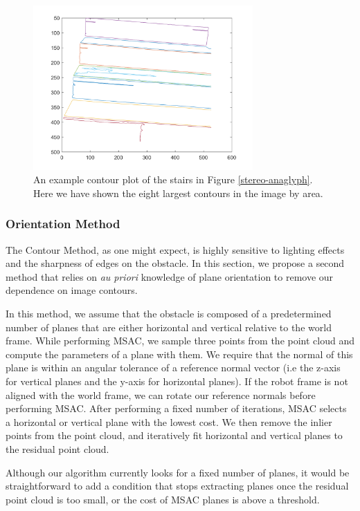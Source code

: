 \begin{figure}[!h]
\centering
\includegraphics[width=3.3in]{Sections/Figures/good_contour_plot_12-7.png}
\caption{An example contour plot of the stairs in Figure \ref{stereo-anaglyph}. Here we have shown the eight largest contours in the image by area.}
\label{contours-example}
\end{figure}

\subsubsection{Orientation Method} \label{orient-method}

The Contour Method, as one might expect, is highly sensitive to lighting effects and the sharpness of edges on the obstacle. In this section, we propose a second method that relies on \textit{au priori} knowledge of plane orientation to remove our dependence on image contours.

In this method, we assume that the obstacle is composed of a predetermined number of planes that are either horizontal and vertical relative to the world frame. While performing MSAC, we sample three points from the point cloud and compute the parameters of a plane with them. We require that the normal of this plane is within an angular tolerance of a reference normal vector (i.e the z-axis for vertical planes and the y-axis for horizontal planes). If the robot frame is not aligned with the world frame, we can rotate our reference normals before performing MSAC. After performing a fixed number of iterations, MSAC selects a horizontal or vertical plane with the lowest cost. We then remove the inlier points from the point cloud, and iteratively fit horizontal and vertical planes to the residual point cloud.

Although our algorithm currently looks for a fixed number of planes, it would be straightforward to add a condition that stops extracting planes once the residual point cloud is too small, or the cost of MSAC planes is above a threshold.

